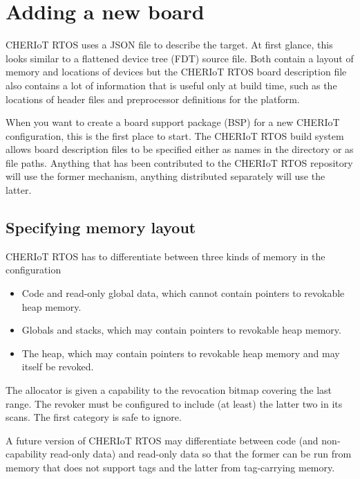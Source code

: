 \chapter[label=new_board]{Adding a new board}

CHERIoT RTOS uses a JSON file to describe the target.
At first glance, this looks similar to a flattened device tree (FDT) source file.
Both contain a layout of memory and locations of devices but the CHERIoT RTOS board description file also contains a lot of information that is useful only at build time, such as the locations of header files and preprocessor definitions for the platform.

When you want to create a board support package (BSP) for a new CHERIoT configuration, this is the first place to start.
The CHERIoT RTOS build system allows board description files to be specified either as names in the  directory or as file paths.
Anything that has been contributed to the CHERIoT RTOS repository will use the former mechanism, anything distributed separately will use the latter.

\section{Specifying memory layout}

CHERIoT RTOS has to differentiate between three kinds of memory in the configuration

\begin{itemize}
	\item{Code and read-only global data, which cannot contain pointers to revokable heap memory.}
	\item{Globals and stacks, which may contain pointers to revokable heap memory.}
	\item{The heap, which may contain pointers to revokable heap memory and may itself be revoked.}
\end{itemize}

The allocator is given a capability to the revocation bitmap covering the last range.
The revoker must be configured to include (at least) the latter two in its scans.
The first category is safe to ignore.

\begin{note}
A future version of CHERIoT RTOS may differentiate between code (and non-capability read-only data) and read-only data so that the former can be run from memory that does not support tags and the latter from tag-carrying memory.
\end{note}

